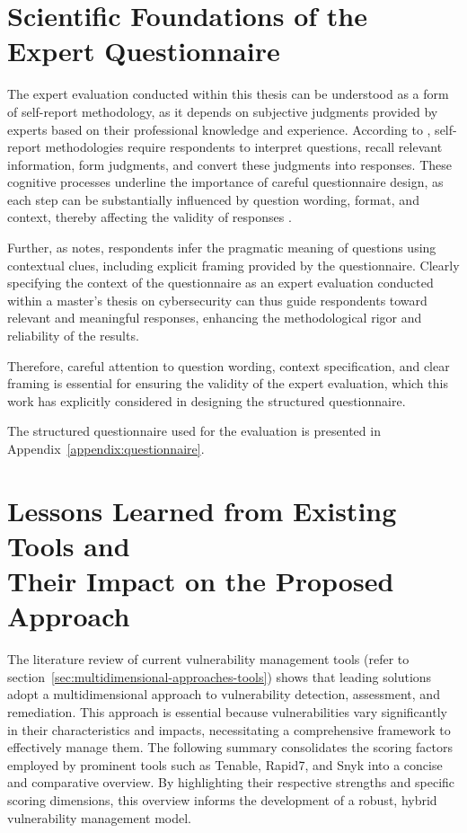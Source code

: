 \section{Scientific Foundations of the Expert Questionnaire}
\label{sec:scientific-foundations-questionnaire}

The expert evaluation conducted within this thesis can be understood as a form of self-report methodology, as it depends on subjective judgments provided by experts based on their professional knowledge and experience. According to \textcite{lucas_richard_e_global_2006}, self-report methodologies require respondents to interpret questions, recall relevant information, form judgments, and convert these judgments into responses. These cognitive processes underline the importance of careful questionnaire design, as each step can be substantially influenced by question wording, format, and context, thereby affecting the validity of responses \autocite{lucas_richard_e_global_2006}.

Further, as \textcite{schwarz_self-reports_1999} notes, respondents infer the pragmatic meaning of questions using contextual clues, including explicit framing provided by the questionnaire. Clearly specifying the context of the questionnaire as an expert evaluation conducted within a master's thesis on cybersecurity can thus guide respondents toward relevant and meaningful responses, enhancing the methodological rigor and reliability of the results.

Therefore, careful attention to question wording, context specification, and clear framing is essential for ensuring the validity of the expert evaluation, which this work has explicitly considered in designing the structured questionnaire.

The structured questionnaire used for the evaluation is presented in Appendix~\ref{appendix:questionnaire}.

\section{Lessons Learned from Existing Tools and \\ Their Impact on the Proposed Approach}
\label{sec:lessons-from-tools}

The literature review of current vulnerability management tools (refer to section~\ref{sec:multidimensional-approaches-tools}) shows that leading solutions adopt a multidimensional approach to vulnerability detection, assessment, and remediation. This approach is essential because vulnerabilities vary significantly in their characteristics and impacts, necessitating a comprehensive framework to effectively manage them. The following summary consolidates the scoring factors employed by prominent tools such as Tenable, Rapid7, and Snyk into a concise and comparative overview. By highlighting their respective strengths and specific scoring dimensions, this overview informs the development of a robust, hybrid vulnerability management model.

